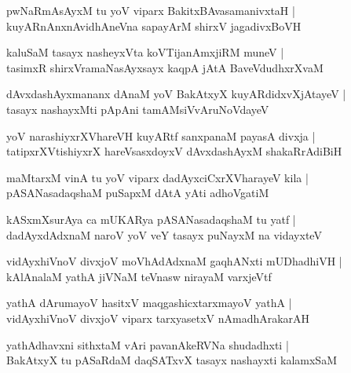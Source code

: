\begin{shloka}
pwNaRmAsAyxM tu yoV viparx BakitxBAvasamanivxtaH |\\
kuyARnAnxnAvidhAneVna sapayArM shirxV jagadivxBoVH
\end{shloka}

\begin{shloka}
kaluSaM tasayx nasheyxVta koVTijanAmxjiRM muneV |\\
tasimxR shirxVramaNasAyxsayx kaqpA jAtA BaveVdudhxrXvaM 
\end{shloka}

\begin{shloka}
dAvxdashAyxmananx dAnaM yoV BakAtxyX kuyARdidxvXjAtayeV |\\
tasayx nashayxMti pApAni tamAMsiVvAruNoVdayeV 
\end{shloka}

\begin{shloka}
yoV narashiyxrXVhareVH kuyARtf sanxpanaM payasA divxja |\\
tatipxrXVtishiyxrX hareVsasxdoyxV dAvxdashAyxM shakaRrAdiBiH
\end{shloka}

\begin{shloka}
maMtarxM vinA tu yoV viparx dadAyxciCxrXVharayeV kila |\\
pASANasadaqshaM puSapxM dAtA yAti adhoVgatiM
\end{shloka}

\begin{shloka}
kASxmXsurAya ca mUKARya pASANasadaqshaM tu yatf |\\
dadAyxdAdxnaM naroV yoV veY tasayx puNayxM na vidayxteV
\end{shloka}

\begin{shloka}
vidAyxhiVnoV divxjoV moVhAdAdxnaM gaqhANxti mUDhadhiVH |\\
kAlAnalaM yathA jiVNaM teVnasw nirayaM varxjeVtf
\end{shloka}

\begin{shloka}
yathA dArumayoV hasitxV maqgashicxtarxmayoV yathA |\\
vidAyxhiVnoV divxjoV viparx tarxyasetxV nAmadhArakarAH 
\end{shloka}

\begin{shloka}
yathAdhavxni sithxtaM vAri pavanAkeRVNa shudadhxti |\\
BakAtxyX tu pASaRdaM daqSATxvX tasayx nashayxti kalamxSaM
\end{shloka}

